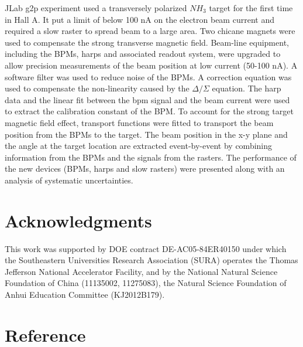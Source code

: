 \documentclass[english,review,number,sort&compress]{elsarticle}
\begin{document}
JLab g2p experiment used a transversely polarized $NH_{3}$ target for the first time in Hall A. It put a limit of below 100 nA on the electron beam current and required a slow raster to spread beam to a large area. Two chicane magnets were used to compensate the strong transverse magnetic field. Beam-line equipment, including the BPMs, harps and associated readout system, were upgraded to allow precision measurements of the beam position at low current (50-100 nA). A software filter was used to reduce noise of the BPMs. A correction equation was used to compensate the non-linearity caused by the $\Delta/\Sigma$ equation. The harp data and the linear fit between the bpm signal and the beam current were used to extract the calibration constant of the BPM. To account for the strong target magnetic field effect, transport functions were fitted to transport the beam position from the BPMs to the target. The beam position in the x-y plane and the angle at the target location are extracted event-by-event by combining information from the BPMs and the signals from the rasters. The performance of the new devices (BPMs, harps and slow rasters) were presented along with an analysis of systematic uncertainties.


\section*{Acknowledgments}

This work was supported by DOE contract DE-AC05-84ER40150 under which the Southeastern Universities Research Association (SURA) operates the Thomas Jefferson National Accelerator Facility, and by the National Natural Science Foundation of China (11135002, 11275083), the Natural Science Foundation of Anhui Education Committee (KJ2012B179).


\section*{Reference}


\end{document}
